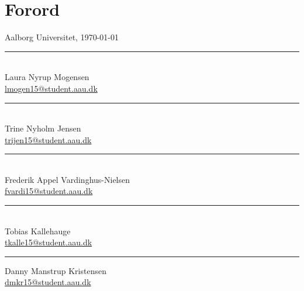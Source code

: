 \clearpage
\chapter*{Forord}

\vspace{\baselineskip}\hfill Aalborg Universitet, \today
\vfill\noindent
\begin{minipage}[b]{0.45\textwidth}
 \centering
 \rule{\textwidth}{0.5pt}\\
  Laura Nyrup Mogensen\\
 {\footnotesize \href{mailto:lmogen15@student.aau.dk}{lmogen15@student.aau.dk}}
\end{minipage}
\hfill
\begin{minipage}[b]{0.45\textwidth}
 \centering
 \rule{\textwidth}{0.5pt}\\
  Trine Nyholm Jensen\\
 {\footnotesize \href{mailto:trijen15@student.aau.dk}{trijen15@student.aau.dk}}
\end{minipage}
\vspace{3\baselineskip}
\vspace{1\baselineskip}
\begin{minipage}[b]{0.45\textwidth}
 \centering
 \rule{\textwidth}{0.5pt}\\
  Frederik Appel Vardinghus-Nielsen\\
 {\footnotesize \href{mailto:fvardi15@student.aau.dk}{fvardi15@student.aau.dk}}
\end{minipage}
\hfill
\begin{minipage}[b]{0.45\textwidth}
 \centering
 \rule{\textwidth}{0.5pt}\\
  Tobias Kallehauge\\
 {\footnotesize \href{mailto:tkalle15@student.aau.dk}{tkalle15@student.aau.dk}}
\end{minipage}
\vspace{2\baselineskip}
\vspace{1\baselineskip}
\begin{center}
\begin{minipage}[b]{0.45\textwidth}
 \centering
 \rule{\textwidth}{0.5pt}
  Danny Manstrup Kristensen\\
 {\footnotesize \href{mailto:dmkr15@student.aau.dk}{dmkr15@student.aau.dk}}
\end{minipage}
\end{center}